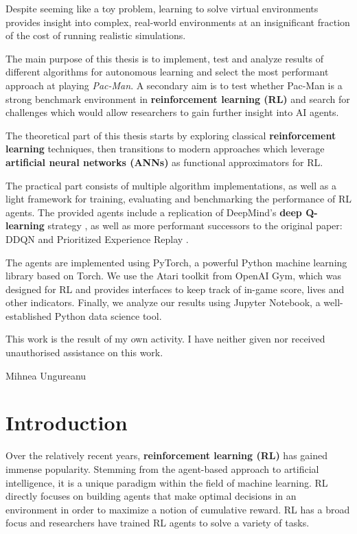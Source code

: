 \documentclass[12pt,twoside]{report}
\begin{document}
Despite seeming like a toy problem, learning to solve virtual environments provides insight into complex, real-world environments at an insignificant fraction of the cost of running realistic simulations.

The main purpose of this thesis is to implement, test and analyze results of different algorithms for autonomous learning and select the most performant approach at playing \emph{Pac-Man}.
A secondary aim is to test whether Pac-Man is a strong benchmark environment in \textbf{reinforcement learning (RL)} and search for challenges which would allow researchers to gain further insight into AI agents.

The theoretical part of this thesis starts by exploring classical \textbf{reinforcement learning} techniques, then transitions to modern approaches which leverage \textbf{artificial neural networks (ANNs)} as functional approximators for RL.

The practical part consists of multiple algorithm implementations, as well as a light framework for training, evaluating and benchmarking the performance of RL agents.
The provided agents include a replication of DeepMind’s \textbf{deep  Q-learning} strategy \cite{atari-dqn}, as well as more performant successors to the original paper: DDQN \cite{ddqn-paper} and Prioritized Experience Replay \cite{per-paper}.

The agents are implemented using PyTorch, a powerful Python machine learning library based on Torch. We use the Atari toolkit from OpenAI Gym, which was designed for RL and provides interfaces to keep track of in-game score, lives and other indicators.
Finally, we analyze our results using Jupyter Notebook, a well-established Python data science tool.

\hfill \break
This work is the result of my own activity. I have neither given nor received unauthorised assistance on this work.
\begin{flushright}
    Mihnea Ungureanu
\end{flushright}


\tableofcontents


\chapter{Introduction}
Over the relatively recent years, \textbf{reinforcement learning (RL)} has gained immense popularity.
Stemming from the agent-based approach to artificial intelligence, it is a unique paradigm within the field of machine learning.
RL directly focuses on building agents that make optimal decisions in an environment in order to maximize a notion of cumulative reward.
RL has a broad focus and researchers have trained RL agents to solve a variety of tasks.
\end{document}
